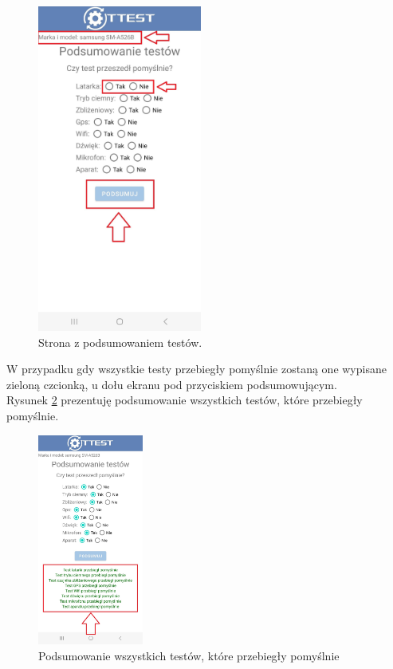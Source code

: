 \begin{figure}[!hbt]
	\begin{center}
		\includegraphics[angle=360, width=0.48\textwidth]{rys/punkt6/wyniki}
		\caption{Strona z podsumowaniem testów.}
		\label{rys:wyniki}
	\end{center}
\end{figure}

W przypadku gdy wszystkie testy przebiegły pomyślnie zostaną one wypisane zieloną czcionką, u dołu ekranu pod przyciskiem podsumowującym. \\
Rysunek \ref{rys:wyniki1} prezentuję podsumowanie wszystkich testów, które przebiegły pomyślnie.

\newpage


\begin{figure}[!hbt]
	\begin{center}
		\includegraphics[angle=360, width=0.31\textwidth]{rys/punkt6/wyniki1}
		\caption{Podsumowanie wszystkich testów, które przebiegły pomyślnie}
		\label{rys:wyniki1}
	\end{center}
\end{figure}

